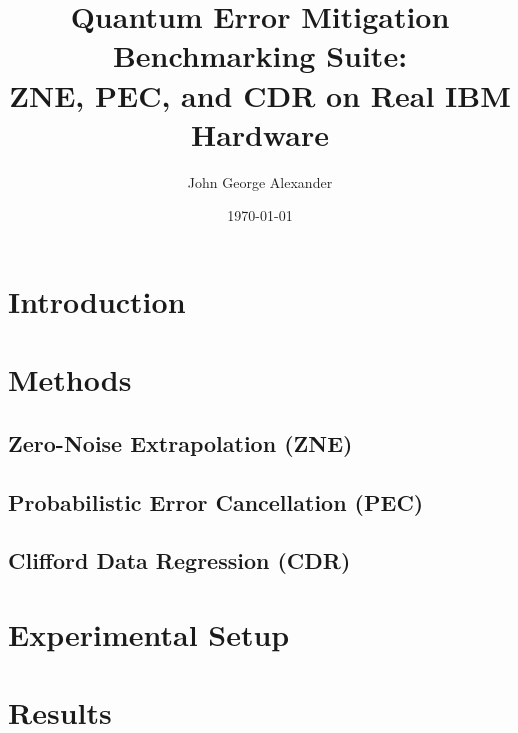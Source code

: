 \documentclass[11pt, a4paper]{article}
\title{Quantum Error Mitigation Benchmarking Suite:\\
       ZNE, PEC, and CDR on Real IBM Hardware}
\author{John George Alexander}
\date{\today}
\begin{document}
\maketitle

\begin{abstract}
\end{abstract}

\section{Introduction}

\section{Methods}

\subsection{Zero-Noise Extrapolation (ZNE)}

\subsection{Probabilistic Error Cancellation (PEC)}

\subsection{Clifford Data Regression (CDR)}

\section{Experimental Setup}

\section{Results}
\end{document}
